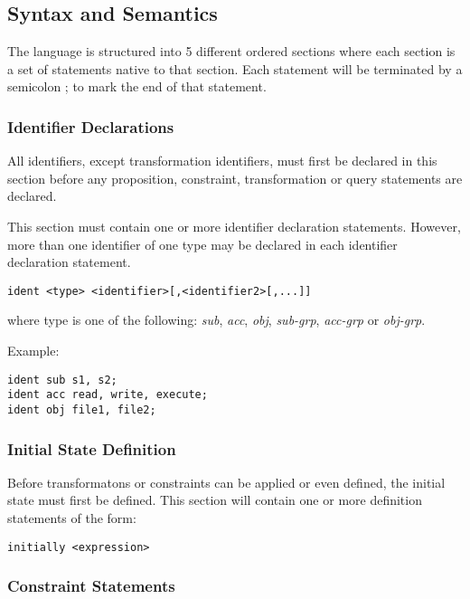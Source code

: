 \documentclass[a4paper]{article}
\begin{document}
    \subsection{Syntax and Semantics}

      The language is structured into 5 different ordered sections where each
      section is a set of statements native to that section. Each statement
      will be terminated by a semicolon ; to mark the end of that statement.

      \subsubsection{Identifier Declarations}

        All identifiers, except transformation identifiers, must first be 
        declared in this section before any proposition, constraint, 
        transformation or query statements are declared.

        This section must contain one or more identifier declaration
        statements. However, more than one identifier of one type may be 
        declared in each identifier declaration statement.

\begin{verbatim}
ident <type> <identifier>[,<identifier2>[,...]]
\end{verbatim}

        where type is one of the following: \emph{sub}, \emph{acc}, \emph{obj},
        \emph{sub-grp}, \emph{acc-grp} or \emph{obj-grp}.

        Example:

\begin{verbatim}
ident sub s1, s2;
ident acc read, write, execute;
ident obj file1, file2;
\end{verbatim}

      \subsubsection{Initial State Definition}

        Before transformatons or constraints can be applied or even defined,
        the initial state must first be defined. This section will contain
        one or more definition statements of the form:

\begin{verbatim}
initially <expression>
\end{verbatim}

      \subsubsection{Constraint Statements}
\end{document}
